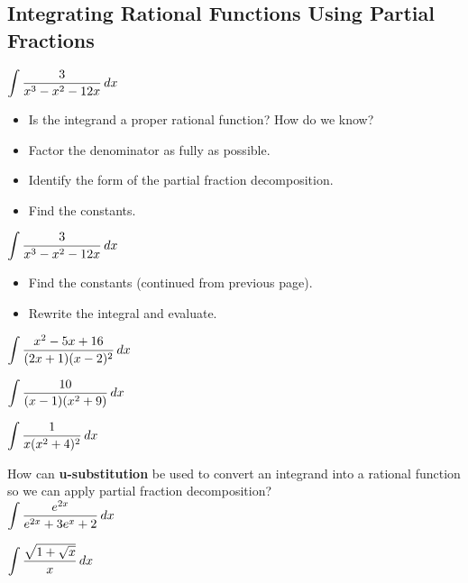 \documentclass[12pt]{article}
\begin{document}
\newpage

\subsection*{Integrating Rational Functions Using Partial Fractions}

\Example $\displaystyle\int\frac{3}{x^3-x^2-12x}\,dx$

\begin{itemize}
\item[\tc{1}] Is the integrand a proper rational function? How do we know?

\vspace{15mm}

\item[\tc{2}] Factor the denominator as fully as possible.

\vspace{30mm}

\item[\tc{3}] Identify the form of the partial fraction decomposition.

\vspace{30mm}

\item[\tc{4}] Find the constants.
\end{itemize}

\newpage

\ExampleCont $\displaystyle\int\frac{3}{x^3-x^2-12x}\,dx$

\begin{itemize}
\item[\tc{4}] Find the constants (continued from previous page).

\vspace{160mm}

\item[\tc{5}] Rewrite the integral and evaluate.
\end{itemize}
\newpage

\Example $\displaystyle\int\frac{x^2-5x+16}{(2x+1)(x-2)^2}\,dx$

\newpage

\Example $\displaystyle\int\frac{10}{(x-1)(x^2+9)}\,dx$

\newpage

\Example $\displaystyle\int\frac{1}{x(x^2+4)^2}\,dx$

\newpage

How can \textbf{u-substitution} be used to convert an integrand into a rational function so we can apply partial fraction decomposition?\\

\Example $\displaystyle\int\frac{e^{2x}}{e^{2x}+3e^x+2}\,dx$

\vfill

\Example $\displaystyle\int\frac{\sqrt{1+\sqrt{x}}}{x}\,dx$

\vfill
\end{document}
